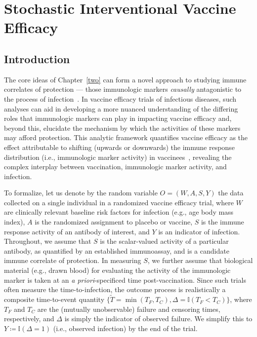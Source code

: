 \chapter{Stochastic Interventional Vaccine Efficacy}\label{three}

\section{Introduction}

The core ideas of Chapter~\ref{two} can form a novel approach to studying immune
correlates of protection --- those immunologic markers \textit{causally}
antagonistic to the process of infection~\citep{plotkin2012nomenclature}. In
vaccine efficacy trials of infectious diseases, such analyses can aid in
developing a more nuanced understanding of the differing roles that immunologic
markers can play in impacting vaccine efficacy and, beyond this, elucidate the
mechanism by which the activities of these markers may afford protection. This
analytic framework quantifies vaccine efficacy as the effect attributable to
shifting (upwards or downwards) the immune response distribution (i.e.,
immunologic marker activity) in vaccinees~\citep{hejazi2020efficient}, revealing
the complex interplay between vaccination, immunologic marker activity, and
infection.

To formalize, let us denote by the random variable $O = (W, A, S, Y)$ the data
collected on a single individual in a randomized vaccine efficacy trial,
where $W$ are clinically relevant baseline risk factors for infection (e.g., age
body mass index), $A$ is the randomized assignment to placebo or vaccine, $S$
is the immune response activity of an antibody of interest, and $Y$ is an
indicator of infection. Throughout, we assume that $S$ is the scalar-valued
activity of a particular antibody, as quantified by an established
immunoassay, and is a candidate immune correlate of protection. In measuring
$S$, we further assume that biological material (e.g., drawn blood) for
evaluating the activity of the immunologic marker is taken at an \textit{a
priori}-specificed time post-vaccination. Since such trials often measure the
time-to-infection, the outcome process is realistically a composite
time-to-event quantity $\{\tilde{T} = \min(T_F, T_C), \Delta = \mathbb{I}(T_F
< T_C)\}$, where $T_F$ and $T_C$ are the (mutually unobservable) failure and
censoring times, respectively, and $\Delta$ is simply the indicator of observed
failure. We simplify this to $Y \coloneqq \mathbb{I}(\Delta = 1)$ (i.e.,
observed infection) by the end of the trial.

